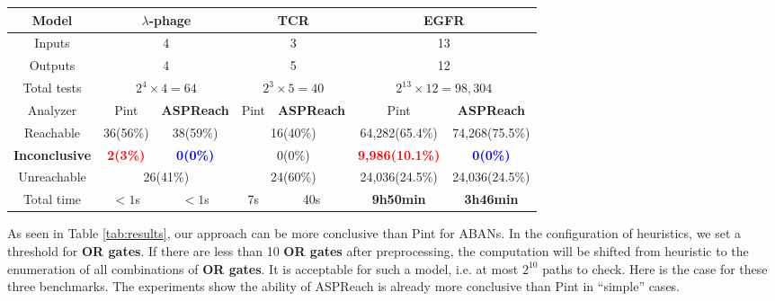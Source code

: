 \documentclass{entcs}
\begin{document}
\begin{table*}[htb]
    \centering
    \begin{tabular}{|c|c|c|c|c|c|c|}
    \hline
  	Model	&\multicolumn{2}{c|}{$\lambda$-phage}	&	  \multicolumn{2}{c|}{TCR} & \multicolumn{2}{c|}{EGFR}  \\
    \hline
    Inputs&\multicolumn{2}{c|}{4}	&	  \multicolumn{2}{c|}{3} & \multicolumn{2}{c|}{13}\\
    \hline
    Outputs&\multicolumn{2}{c|}{4} &	  \multicolumn{2}{c|}{5} & \multicolumn{2}{c|}{12} \\
    \hline
    Total tests&\multicolumn{2}{c|}{$2^4\times 4=64$} & \multicolumn{2}{c|}{$2^3\times 5=40$} & \multicolumn{2}{c|}{$2^{13}\times 12=98,304$}\\
    \hline
    Analyzer  &  Pint       &\textbf{ASPReach}    &  Pint       &\textbf{ASPReach}   &  Pint       &\textbf{ASPReach}             \\
    \hline
    Reachable    & 36(56\%)& 38(59\%)   &  \multicolumn{2}{c|}{16(40\%)}  & 64,282(65.4\%)&74,268(75.5\%)\\
    \hline
    \textbf{Inconclusive} & \textcolor{red}{\textbf{2(3\%)}}&\textcolor{blue}{\textbf{0(0\%)}}& \multicolumn{2}{c|}{0(0\%)}    &\textcolor{red}{\textbf{9,986(10.1\%)}}&\textcolor{blue}{\textbf{0(0\%)}}  \\
    \hline
    Unreachable     &  \multicolumn{2}{c|}{26(41\%)} &  \multicolumn{2}{c|}{24(60\%)} &24,036(24.5\%)&24,036(24.5\%)\\
    \hline
    Total time &  $<1$s       &  $<1$s &  7s       &  40s        & \textbf{9h50min}              & \textbf{3h46min}      \\
    \hline
    \end{tabular}
    \caption{\label{tab:results}%
    Results of the tests on small ($\lambda$-phage) and large (TCR,EGFR) examples from biology literature. 
    Results of model-checkers using global search are memory-out so are not listed in the table.
    ``Reachable", ``Inconclusive" and ``Unreachable" give respectively the number of different results of reachability.
    It is worth noticing that the inconclusive cases in Pint are caused by time-out \cite{folschette2015}. 
  }
\end{table*}

As seen in Table \ref{tab:results}, our approach can be more conclusive than Pint for ABANs.
In the configuration of heuristics, we set a threshold for \textbf{OR gates}.
If there are less than 10 \textbf{OR gates} after preprocessing, the computation will be shifted from heuristic to the enumeration of all combinations of \textbf{OR gates}.
It is acceptable for such a model, i.e. at most $2^{10}$ paths to check. 
Here is the case for these three benchmarks. The experiments show the ability of ASPReach is already more conclusive than Pint in ``simple'' cases.
\end{document}
